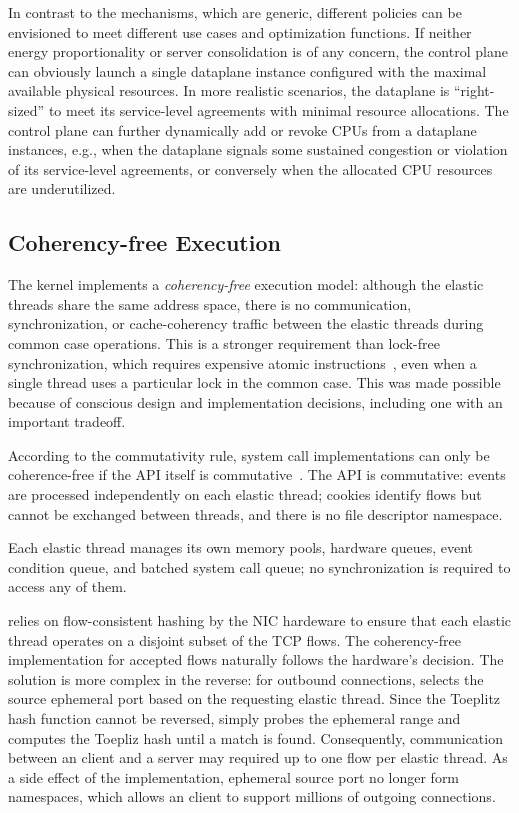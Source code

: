 In contrast to the mechanisms, which are generic, different policies
can be envisioned to meet different use cases and optimization
functions.  If neither energy proportionality or server consolidation
is of any concern, the control plane can obviously launch a single
dataplane instance configured with the maximal available physical
resources.  In more realistic scenarios, the dataplane is
``right-sized'' to meet its service-level agreements with minimal
resource allocations.  The control plane can further dynamically add
or revoke CPUs from a dataplane instances, e.g., when the dataplane
signals some sustained congestion or violation of its service-level
agreements, or conversely when the allocated CPU resources are
underutilized.

\subsection{Coherency-free Execution}
\label{sec:impl:cohfree}

The \ix kernel implements a \emph{coherency-free} execution model:
although the elastic threads share the same address space, there is no
communication, synchronization, or cache-coherency traffic between the
elastic threads during common case operations.  This is a stronger
requirement than lock-free synchronization, which requires expensive
atomic instructions~\cite{missing}, even when a single thread uses a
particular lock in the common case.  This was made possible because of
conscious design and implementation decisions, including one with an
important tradeoff.

 According to the commutativity rule,
system call implementations can only be coherence-free if the API
itself is commutative~\cite{DBLP:conf/sosp/ClementsKZMK13}.  The \ix
API is commutative: events are processed independently on each elastic
thread; cookies identify flows but cannot be exchanged between
threads, and there is no file descriptor namespace.


 Each elastic thread manages its own
memory pools, hardware queues, event condition queue, and batched
system call queue; no synchronization is required to access any of
them.

 \ix relies on flow-consistent
hashing by the NIC hardeware to ensure that each elastic thread
operates on a disjoint subset of the TCP flows.  The coherency-free
implementation for accepted flows naturally follows the hardware's
decision.  The solution is more complex in the reverse: for outbound
connections, \ix selects the source ephemeral port based on the
requesting elastic thread. Since the Toeplitz hash function cannot be
reversed, \ix simply probes the ephemeral range and computes the
Toepliz hash until a match is found.  Consequently, communication
between an \ix client and a server may required up to one flow per
elastic thread.  As a side effect of the implementation, ephemeral
source port no longer form namespaces, which allows an \ix client to
support millions of outgoing connections.

